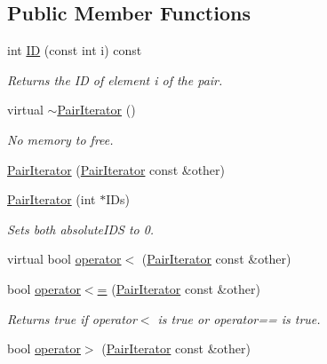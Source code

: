 \subsection*{Public Member Functions}
\begin{DoxyCompactItemize}
\item 
int \hyperlink{classJKBuilder_1_1PairIterator_a370ad37c854fbbf6421ebf9ab35cd027}{ID} (const int i) const 
\begin{DoxyCompactList}\small\item\em Returns the ID of element i of the pair. \item\end{DoxyCompactList}\item 
virtual \hyperlink{classJKBuilder_1_1PairIterator_a129fcb5bc5ef5ddd5760925e80573483}{$\sim$PairIterator} ()
\begin{DoxyCompactList}\small\item\em No memory to free. \item\end{DoxyCompactList}\item 
\hyperlink{classJKBuilder_1_1PairIterator_a4863c44859616a6498bd4447b1e3b056}{PairIterator} (\hyperlink{classJKBuilder_1_1PairIterator}{PairIterator} const \&other)
\item 
\hyperlink{classJKBuilder_1_1PairIterator_a2827cf29cfa8dbb7e254901450b52e5e}{PairIterator} (int $\ast$IDs)
\begin{DoxyCompactList}\small\item\em Sets both absoluteIDS to 0. \item\end{DoxyCompactList}\item 
virtual bool \hyperlink{classJKBuilder_1_1PairIterator_a1984297ca1081efc0513ec2f5e6a6177}{operator$<$} (\hyperlink{classJKBuilder_1_1PairIterator}{PairIterator} const \&other)
\item 
bool \hyperlink{classJKBuilder_1_1PairIterator_a9c95b8dd7929cb34336a944ce96e88a7}{operator$<$=} (\hyperlink{classJKBuilder_1_1PairIterator}{PairIterator} const \&other)
\begin{DoxyCompactList}\small\item\em Returns true if operator$<$ is true or operator== is true. \item\end{DoxyCompactList}\item 
bool \hyperlink{classJKBuilder_1_1PairIterator_ab37a738406950a5e19931f4c09b41f29}{operator$>$} (\hyperlink{classJKBuilder_1_1PairIterator}{PairIterator} const \&other)

\end{DoxyCompactItemize}
